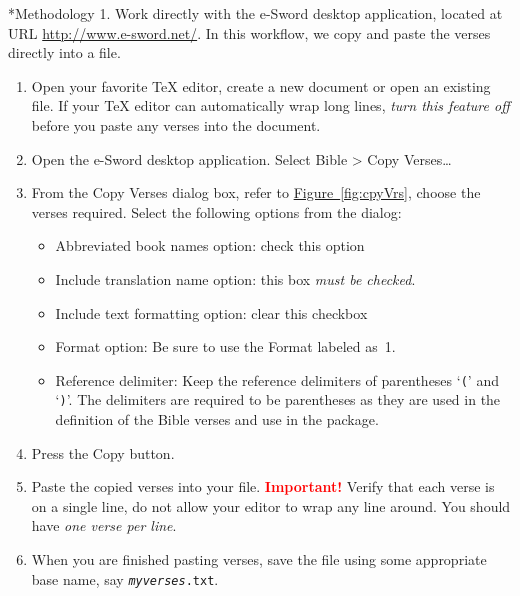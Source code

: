 \documentclass{article}
\makeatletter
\renewcommand*{\theparagraph}{\texorpdfstring{\protect\P\protect\ }{\textparagraph}}
\renewcommand{\paragraph}
    {\renewcommand{\@seccntformat}[1]{\theparagraph}%
    \@startsection{paragraph}{4}{0pt}{6pt}{-3pt}{\color{\aeb@subsubsectioncolor}\bfseries}}
\makeatother
\begin{document}
    \paragraph*{Methodology 1.} Work directly with the \textsf{e-Sword} desktop
    application, located at URL \url{http://www.e-sword.net/}. In this workflow, we copy and
    paste the verses directly into a  file.
    \begin{enumerate}
        \item Open your favorite {\TeX} editor, create a new document or
            open an existing  file. If your {\TeX} editor can
            automatically wrap long lines, \emph{turn this feature off}
            before you paste any verses into the document.
        \item Open the \textsf{e-Sword} desktop application. Select \textsf{Bible
            > Copy Verses\ldots}
        \item From the \textsf{Copy Verses} dialog box, refer to
            \hyperref[fig:cpyVrs]{Figure~\ref*{fig:cpyVrs}}, choose the
            verses required. Select the following options from the dialog:
            \begin{itemize}
               \item \textsf{Abbreviated book names} option: check this option
               \item \textsf{Include translation name} option: this box \emph{must be checked}.
               \item \textsf{Include text formatting} option: clear this checkbox
               \item \textsf{Format} option: Be sure to use the \textsf{Format} labeled as~1.
               \item \textsf{Reference delimiter}: Keep the reference delimiters of
                   parentheses `\texttt{(}' and `\texttt{)}'. The delimiters are required to
                   be parentheses as they are used in the definition of the Bible
                   verses and use in the  package.
            \end{itemize}
        \item Press the \textsf{Copy} button.
        \item Paste the copied verses into your  file. \textbf{\textcolor{red}{Important!}}
            Verify that each verse is on a single line, do not allow your editor to wrap any line around.
            You should have \emph{one verse per line}.
        \item When you are finished pasting verses, save the  file
            using some appropriate base name, say
            \texttt{{\slshape{myverses}}.txt}.
    \end{enumerate}
\end{document}
